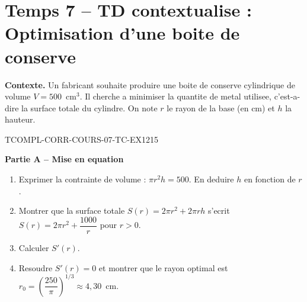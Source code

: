 

\section*{Temps 7 -- TD contextualise : Optimisation d'une boite de conserve}

\textbf{Contexte.} Un fabricant souhaite produire une boite de conserve cylindrique de volume $V = 500$~cm$^3$. Il cherche a minimiser la quantite de metal utilisee, c'est-a-dire la surface totale du cylindre. On note $r$ le rayon de la base (en cm) et $h$ la hauteur.

\bigskip


\begin{exercice}{TCOMPL-CORR-COURS-07-TC-EX1}{2}{15}

\textbf{Partie A -- Mise en equation}

\begin{enumerate}
  \item Exprimer la contrainte de volume : $\pi r^2 h = 500$. En deduire $h$ en fonction de $r$.
  \item Montrer que la surface totale $S(r) = 2\pi r^2 + 2\pi r h$ s'ecrit $S(r) = 2\pi r^2 + \dfrac{1000}{r}$ pour $r > 0$.
  \item Calculer $S'(r)$.
  \item Resoudre $S'(r) = 0$ et montrer que le rayon optimal est $r_0 = \left(\dfrac{250}{\pi}\right)^{1/3} \approx 4{,}30$~cm.
\end{enumerate}

\end{exercice}

